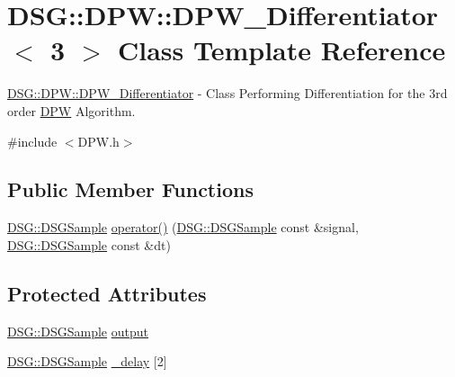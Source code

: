 \hypertarget{class_d_s_g_1_1_d_p_w_1_1_d_p_w___differentiator_3_013_01_4}{\section{D\+S\+G\+:\+:D\+P\+W\+:\+:D\+P\+W\+\_\+\+Differentiator$<$ 3 $>$ Class Template Reference}
\label{class_d_s_g_1_1_d_p_w_1_1_d_p_w___differentiator_3_013_01_4}
}


\hyperlink{class_d_s_g_1_1_d_p_w_1_1_d_p_w___differentiator}{D\+S\+G\+::\+D\+P\+W\+::\+D\+P\+W\+\_\+\+Differentiator} -\/ Class Performing Differentiation for the 3rd order \hyperlink{namespace_d_s_g_1_1_d_p_w}{D\+P\+W} Algorithm.  




{\ttfamily \#include $<$D\+P\+W.\+h$>$}

\subsection*{Public Member Functions}
\begin{DoxyCompactItemize}
\item 
\hyperlink{namespace_d_s_g_ac39a94cd27ebcd9c1e7502d0c624894a}{D\+S\+G\+::\+D\+S\+G\+Sample} \hyperlink{class_d_s_g_1_1_d_p_w_1_1_d_p_w___differentiator_3_013_01_4_af17617ff237bf4d56161ffb5ee4e320b}{operator()} (\hyperlink{namespace_d_s_g_ac39a94cd27ebcd9c1e7502d0c624894a}{D\+S\+G\+::\+D\+S\+G\+Sample} const \&signal, \hyperlink{namespace_d_s_g_ac39a94cd27ebcd9c1e7502d0c624894a}{D\+S\+G\+::\+D\+S\+G\+Sample} const \&dt)
\end{DoxyCompactItemize}
\subsection*{Protected Attributes}
\begin{DoxyCompactItemize}
\item 
\hyperlink{namespace_d_s_g_ac39a94cd27ebcd9c1e7502d0c624894a}{D\+S\+G\+::\+D\+S\+G\+Sample} \hyperlink{class_d_s_g_1_1_d_p_w_1_1_d_p_w___differentiator_3_013_01_4_a09eeb701309aa1f1034964921417a904}{output}
\item 
\hyperlink{namespace_d_s_g_ac39a94cd27ebcd9c1e7502d0c624894a}{D\+S\+G\+::\+D\+S\+G\+Sample} \hyperlink{class_d_s_g_1_1_d_p_w_1_1_d_p_w___differentiator_3_013_01_4_a65e5486785a5007e15837e0891e24d81}{\+\_\+delay} \mbox{[}2\mbox{]}
\end{DoxyCompactItemize}


